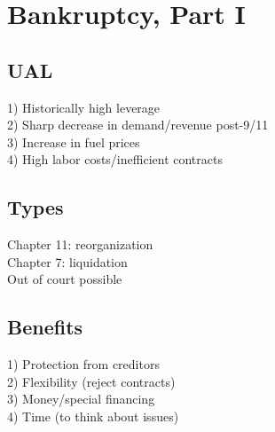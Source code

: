 \section{Bankruptcy, Part I}
	\subsection*{UAL}
	1) Historically high leverage\\
	2) Sharp decrease in demand/revenue post-9/11\\
	3) Increase in fuel prices\\
	4) High labor costs/inefficient contracts
	
	\subsection*{Types}
	Chapter 11: reorganization\\
	Chapter 7: liquidation\\
	Out of court possible
	
	\subsection*{Benefits}
	1) Protection from creditors\\
	2) Flexibility (reject contracts)\\
	3) Money/special financing\\
	4) Time (to think about issues)
	